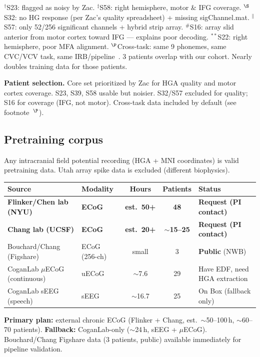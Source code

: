\documentclass[11pt,letterpaper]{article}
\begin{document}
$^\dagger$S23: flagged as noisy by Zac. \quad
$^\ddagger$S58: right hemisphere, motor \& IFG coverage. \quad
$^\S$S32: no HG response (per Zac's quality spreadsheet) + missing sigChannel.mat. \quad
$^\|$S57: only 52/256 significant channels + hybrid strip array. \quad
$^\#$S16: array slid anterior from motor cortex toward IFG --- explains poor decoding. \quad
$^{**}$S22: right hemisphere, poor MFA alignment. \quad
$^\P$Cross-task: same 9 phonemes, same CVC/VCV task, same IRB/pipeline~\cite{duraivel2025}. 3 patients overlap with our cohort. Nearly doubles training data for those patients.

\textbf{Patient selection.} Core set prioritized by Zac for HGA quality and motor cortex coverage. S23, S39, S58 usable but noisier. S32/S57 excluded for quality; S16 for coverage (IFG, not motor). Cross-task data included by default (see footnote~$^\P$).

\subsection{Pretraining corpus}\label{sec:pretrain-data}

Any intracranial field potential recording (HGA + MNI coordinates) is valid pretraining data. Utah array spike data is excluded (different biophysics).

\begin{table}[ht!]\centering\small
\begin{tabular}{@{}llccl@{}}
\toprule
\textbf{Source} & \textbf{Modality} & \textbf{Hours} & \textbf{Patients} & \textbf{Status} \\
\midrule
\textbf{Flinker/Chen lab (NYU)} & \textbf{ECoG} & \textbf{est.\ 50+} & \textbf{48} & \textbf{Request (PI contact)} \\
\textbf{Chang lab (UCSF)} & \textbf{ECoG} & \textbf{est.\ 20+} & \textbf{${\sim}$15--25} & \textbf{Request (PI contact)} \\
Bouchard/Chang (Figshare) & ECoG (256-ch) & small & 3 & \textbf{Public} (NWB) \\
CoganLab $\mu$ECoG (continuous) & uECoG & ${\sim}$7.6 & 29 & Have EDF, need HGA extraction \\
CoganLab sEEG (speech) & sEEG & ${\sim}$16.7 & 25 & On Box (fallback only) \\
\bottomrule
\end{tabular}
\end{table}

\textbf{Primary plan:} external chronic ECoG (Flinker + Chang, est.\ ${\sim}$50--100\,h, ${\sim}$60--70 patients). \textbf{Fallback:} CoganLab-only (${\sim}$24\,h, sEEG + $\mu$ECoG). Bouchard/Chang Figshare data (3 patients, public) available immediately for pipeline validation.
\end{document}
